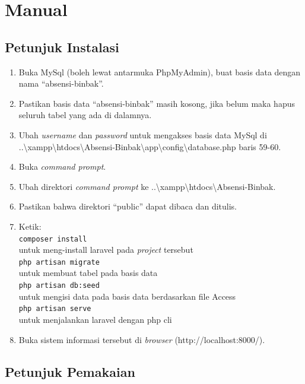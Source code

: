 \section{Manual}

\subsection{Petunjuk Instalasi}
\begin{enumerate}
	\item Buka MySql (boleh lewat antarmuka PhpMyAdmin), buat basis data dengan nama ``absensi-binbak''.
	\item Pastikan basis data ``absensi-binbak'' masih kosong, jika belum maka hapus seluruh tabel yang ada di dalamnya.
	\item Ubah \textit{username} dan \textit{password} untuk mengakses basis data MySql di ..\textbackslash xampp\textbackslash htdocs\textbackslash Absensi-Binbak\textbackslash app\textbackslash config\textbackslash database.php baris 59-60.
	\item Buka \textit{command prompt}.
	\item Ubah direktori \textit{command prompt} ke ..\textbackslash xampp\textbackslash htdocs\textbackslash Absensi-Binbak.
	\item Pastikan bahwa direktori ``public'' dapat dibaca dan ditulis.
	\item Ketik: \\\texttt{composer install}\\untuk meng-install laravel pada \textit{project} tersebut\\\texttt{php artisan migrate}\\untuk membuat tabel pada basis data\\\texttt{php artisan db:seed}\\untuk mengisi data pada basis data berdasarkan file Access\\\texttt{php artisan serve}\\untuk menjalankan laravel dengan php cli
	\item Buka sistem informasi tersebut di \textit{browser} (http://localhost:8000/).
\end{enumerate}

\subsection{Petunjuk Pemakaian}


